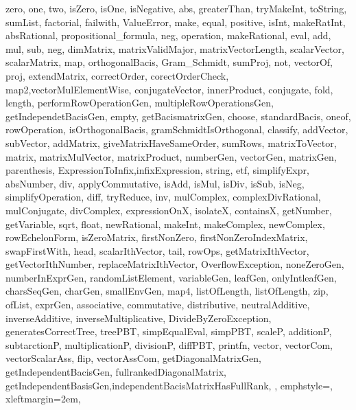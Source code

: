 {{    zero, one, two, isZero, isOne, isNegative, abs, greaterThan, tryMakeInt, toString, sumList, factorial, failwith, ValueError, make, equal, positive, isInt, makeRatInt, absRational, propositional_formula, neg, operation, makeRational, eval, add, mul, sub, neg, dimMatrix, matrixValidMajor, matrixVectorLength, scalarVector, scalarMatrix, map, orthogonalBacis, Gram_Schmidt, sumProj, not, vectorOf, proj, extendMatrix, correctOrder, corectOrderCheck, map2,vectorMulElementWise, conjugateVector, innerProduct, conjugate, fold, length, performRowOperationGen, multipleRowOperationsGen, getIndependetBacisGen, empty, getBacismatrixGen, choose, standardBacis, oneof, rowOperation, isOrthogonalBacis, gramSchmidtIsOrthogonal, classify, addVector, subVector, addMatrix, giveMatrixHaveSameOrder, sumRows, matrixToVector, matrix, matrixMulVector, matrixProduct, numberGen, vectorGen, matrixGen, parenthesis, ExpressionToInfix,infixExpression, string, etf, simplifyExpr, absNumber, div, applyCommutative, isAdd, isMul, isDiv, isSub, isNeg, simplifyOperation, diff, tryReduce, inv, mulComplex, complexDivRational, mulConjugate, divComplex, expressionOnX, isolateX, containsX, getNumber, getVariable, sqrt, float, newRational, makeInt, makeComplex, newComplex, rowEchelonForm, isZeroMatrix, firstNonZero, firstNonZeroIndexMatrix, swapFirstWith, head, scalarIthVector, tail, rowOps, getMatrixIthVector, getVectorIthNumber, replaceMatrixIthVector, OverflowException, noneZeroGen, numberInExprGen, randomListElement, variableGen, leafGen, onlyIntleafGen, charsSeqGen, charGen, smallEnvGen, map4, listOfLength, listOfLength, zip, ofList, exprGen, associative, commutative, distributive, neutralAdditive, inverseAdditive, inverseMultiplicative, DivideByZeroException, generatesCorrectTree, treePBT, simpEqualEval, simpPBT, scaleP, additionP, subtarctionP, multiplicationP, divisionP, diffPBT, printfn, vector, vectorCom, vectorScalarAss, flip, vectorAssCom, getDiagonalMatrixGen, getIndependentBacisGen, fullrankedDiagonalMatrix, getIndependentBasisGen,independentBacisMatrixHasFullRank,
    }, %
  emphstyle=\color{red},
  xleftmargin=2em,
}





\lstset{style=fsharpstyle}

